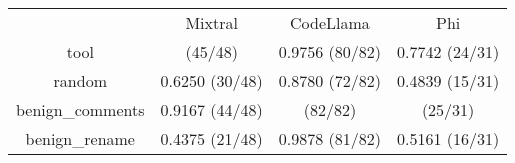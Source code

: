 \begin{table}[h!]
\centering
\begin{tabular}{|c|c|c|c|}
\hline
 & Mixtral & CodeLlama & Phi \\

tool & \cellcolor{blue!10}{0.9375} (45/48) & 0.9756 (80/82) & 0.7742 (24/31) \\

random & 0.6250 (30/48) & 0.8780 (72/82) & 0.4839 (15/31) \\

benign_comments & 0.9167 (44/48) & \cellcolor{blue!10}{1.0000} (82/82) & \cellcolor{blue!10}{0.8065} (25/31) \\

benign_rename & 0.4375 (21/48) & 0.9878 (81/82) & 0.5161 (16/31) \\

\end{tabular}
\end{table}